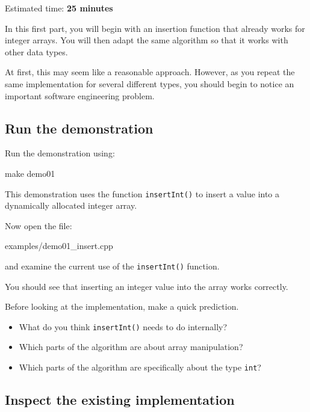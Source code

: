 \documentclass{csc2059practical}
\begin{document}
\begin{infobox}
Estimated time: \textbf{25 minutes}
\end{infobox}

In this first part, you will begin with an insertion function that already works for integer arrays. You will then adapt the same algorithm so that it works with other data types.

At first, this may seem like a reasonable approach. However, as you repeat the same implementation for several different types, you should begin to notice an important software engineering problem.

\subsection{Run the demonstration}

Run the demonstration using:

\begin{terminal}
make demo01
\end{terminal}

This demonstration uses the function \texttt{insertInt()} to insert a value into a dynamically allocated integer array.

Now open the file: 

\begin{terminal}
    examples/demo01_insert.cpp
\end{terminal}

and examine the current use of the \texttt{insertInt()} function.

You should see that inserting an integer value into the array works correctly.

\begin{reflectionbox}
    Before looking at the implementation, make a quick prediction.
    
    \begin{itemize}
        \item What do you think \texttt{insertInt()} needs to do internally?
        \item Which parts of the algorithm are about array manipulation?
        \item Which parts of the algorithm are specifically about the type \texttt{int}?
    \end{itemize}
\end{reflectionbox}

\subsection{Inspect the existing implementation}
\end{document}
